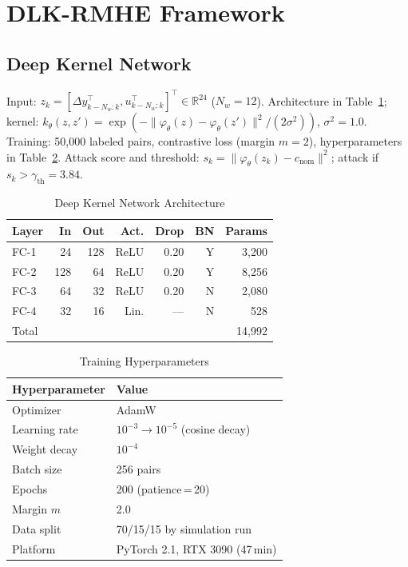 \documentclass[journal,twoside]{IEEEtran}
\newcommand{\R}{\mathbb{R}}
\begin{document}
\section{DLK-RMHE Framework}\label{sec:framework}

\subsection{Deep Kernel Network}

Input: $z_k=[\Delta y_{k-N_w:k}^\top,u_{k-N_w:k}^\top]^\top\in\R^{24}$
($N_w{=}12$). Architecture in Table~\ref{tab:arch}; kernel:
$k_\theta(z,z')=\exp(-\|\varphi_\theta(z)-\varphi_\theta(z')\|^2/(2\sigma^2))$,
$\sigma^2{=}1.0$. Training: 50,000 labeled pairs, contrastive loss
(margin $m{=}2$), hyperparameters in Table~\ref{tab:hyper}.
Attack score and threshold:
$s_k=\|\varphi_\theta(z_k)-c_{\mathrm{nom}}\|^2$; attack if $s_k>\gamma_{\mathrm{th}}{=}3.84$.

\begin{table}[!t]
  \caption{Deep Kernel Network Architecture}
  \label{tab:arch}
  \centering
  \begin{tabular}{lrrrrrr}
    \toprule
    Layer & In & Out & Act. & Drop & BN & Params\\
    \midrule
    FC-1 & 24  & 128 & ReLU & 0.20 & Y & 3,200\\
    FC-2 & 128 & 64  & ReLU & 0.20 & Y & 8,256\\
    FC-3 & 64  & 32  & ReLU & 0.20 & N & 2,080\\
    FC-4 & 32  & 16  & Lin. & ---  & N &   528\\
    \midrule
    Total & & & & & & 14,992\\
    \bottomrule
  \end{tabular}
\end{table}

\begin{table}[!t]
  \caption{Training Hyperparameters}
  \label{tab:hyper}
  \centering
  \begin{tabular}{ll}
    \toprule
    Hyperparameter & Value\\
    \midrule
    Optimizer        & AdamW\\
    Learning rate    & $10^{-3}\!\to\!10^{-5}$ (cosine decay)\\
    Weight decay     & $10^{-4}$\\
    Batch size       & 256 pairs\\
    Epochs           & 200 (patience\,=\,20)\\
    Margin $m$       & 2.0\\
    Data split       & 70/15/15 by simulation run\\
    Platform         & PyTorch 2.1, RTX 3090 (47\,min)\\
    \bottomrule
  \end{tabular}
\end{table}
\end{document}
